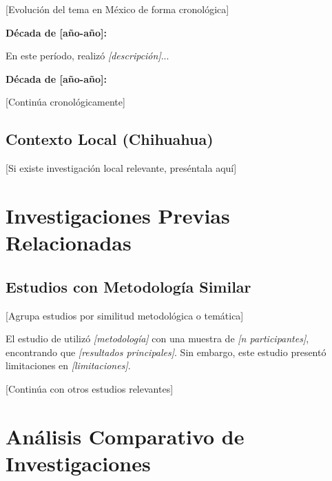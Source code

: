 [Evolución del tema en México de forma cronológica]

\textbf{Década de [año-año]:}

En este período, \cite{autor_mexico} realizó \textit{[descripción]}...

\textbf{Década de [año-año]:}

[Continúa cronológicamente]

\subsection{Contexto Local (Chihuahua)}
\label{subsec:contexto_local}

[Si existe investigación local relevante, preséntala aquí]

\section{Investigaciones Previas Relacionadas}
\label{sec:investigaciones_previas}


\subsection{Estudios con Metodología Similar}
\label{subsec:metodologia_similar}

[Agrupa estudios por similitud metodológica o temática]

El estudio de \cite{autor2023} utilizó \textit{[metodología]} con una muestra de \textit{[n participantes]}, encontrando que \textit{[resultados principales]}. Sin embargo, este estudio presentó limitaciones en \textit{[limitaciones]}.

[Continúa con otros estudios relevantes]

\section{Análisis Comparativo de Investigaciones}
\label{sec:cuadro_comparativo}

